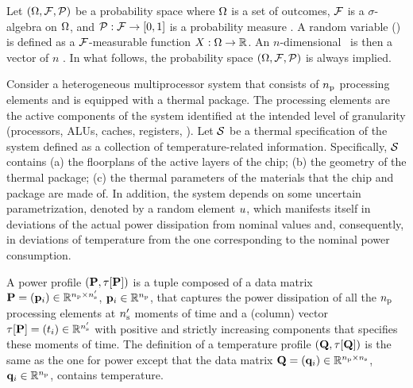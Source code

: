 Let $(\Omega, \mathcal{F}, \mathcal{P})$ be a probability space where $\Omega$ is a set of outcomes, $\mathcal{F}$ is a $\sigma$-algebra on $\Omega$, and $\mathcal{P}: \mathcal{F} \to [0, 1]$ is a probability measure \cite{durrett2010}. A random variable (\rv) is defined as a $\mathcal{F}$-measurable function $X: \Omega \to \mathbb{R}$. An $n$-dimensional \rv\ is then a vector of $n$ \rvs. In what follows, the probability space $(\Omega, \mathcal{F}, \mathcal{P})$ is always implied.

Consider a heterogeneous multiprocessor system that consists of ${n_\text{p}}$ processing elements and is equipped with a thermal package. The processing elements are the active components of the system identified at the intended level of granularity (processors, ALUs, caches, registers, \etc). Let $\mathcal{S}$ be a thermal specification of the system defined as a collection of temperature-related information. Specifically, $\mathcal{S}$ contains (a) the floorplans of the active layers of the chip; (b) the geometry of the thermal package; (c) the thermal parameters of the materials that the chip and package are made of. In addition, the system depends on some uncertain parametrization, denoted by a random element $u$, which manifests itself in deviations of the actual power dissipation from nominal values and, consequently, in deviations of temperature from the one corresponding to the nominal power consumption.

A power profile $\profileP$ is a tuple composed of a data matrix $\mathbf{P} = (\mathbf{p}_i) \in \mathbb{R}^{{n_\text{p}} \times {n_\text{s}'}}$, $\mathbf{p}_i \in \mathbb{R}^{n_\text{p}}$, that captures the power dissipation of all the ${n_\text{p}}$ processing elements at ${n_\text{s}'}$ moments of time and a (column) vector $\tau[\mathbf{P}] = (t_i) \in \mathbb{R}^{{n_\text{s}'}}$ with positive and strictly increasing components that specifies these moments of time. The definition of a temperature profile $\profileT$ is the same as the one for power except that the data matrix $\mathbf{Q} = (\mathbf{q}_i) \in \mathbb{R}^{{n_\text{p}} \times {n_\text{s}}}$, $\mathbf{q}_i \in \mathbb{R}^{n_\text{p}}$, contains temperature.

